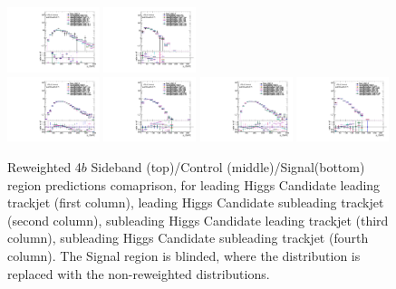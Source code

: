\begin{figure}[htbp!]
\begin{center}
\includegraphics[width=0.24\textwidth,angle=-90]{figures/boosted/AppendixReweight/Compare/Data_FourTag_Control_directcompare_sublHCand_trk0_Pt_1.pdf}
\includegraphics[width=0.24\textwidth,angle=-90]{figures/boosted/AppendixReweight/Compare/Data_FourTag_Control_directcompare_sublHCand_trk1_Pt_1.pdf}\\
\includegraphics[width=0.24\textwidth,angle=-90]{figures/boosted/AppendixReweight/Compare/Data_FourTag_Signal_directcompare_leadHCand_trk0_Pt_1.pdf}
\includegraphics[width=0.24\textwidth,angle=-90]{figures/boosted/AppendixReweight/Compare/Data_FourTag_Signal_directcompare_leadHCand_trk1_Pt_1.pdf}
\includegraphics[width=0.24\textwidth,angle=-90]{figures/boosted/AppendixReweight/Compare/Data_FourTag_Signal_directcompare_sublHCand_trk0_Pt_1.pdf}
\includegraphics[width=0.24\textwidth,angle=-90]{figures/boosted/AppendixReweight/Compare/Data_FourTag_Signal_directcompare_sublHCand_trk1_Pt_1.pdf}\\
\caption{Reweighted 4$b$ Sideband (top)/Control (middle)/Signal(bottom) region predictions comaprison, for leading Higgs Candidate leading trackjet \pt (first column),  leading Higgs Candidate subleading trackjet \pt (second column), subleading Higgs Candidate leading trackjet \pt (third column), subleading Higgs Candidate subleading trackjet \pt (fourth column). The Signal region is blinded, where the distribution is replaced with the non-reweighted distributions.}
\label{fig:app-rw-comp-4b-trkjet}
\end{center}
\end{figure}

\clearpage
